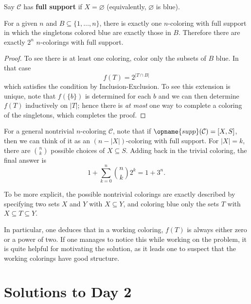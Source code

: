 \documentclass[11pt]{scrartcl}
\begin{document}
Say $\mathcal C$ has \textbf{full support}
if $X = \varnothing$ (equivalently, $\varnothing$ is blue).

\begin{lemma*}
For a given $n$ and $B \subseteq \{1,\dots,n\}$,
there is exactly one $n$-coloring with full support
in which the singletons colored blue are exactly those in $B$.
Therefore there are exactly $2^n$ $n$-colorings with full support.
\end{lemma*}
\begin{proof}
To see there is at least one coloring, color only the subsets of $B$ blue.
In that case \[ f(T) = 2^{\left\lvert T \cap B \right\rvert} \]
which satisfies the condition by Inclusion-Exclusion.
To see this extension is unique,
note that $f(\{b\})$ is determined for each $b$ and we can then determine $f(T)$
inductively on $\left\lvert T \right\rvert$;
hence there is \emph{at most} one way to complete a coloring of the singletons,
which completes the proof.
\end{proof}

For a general nontrivial $n$-coloring $\mathcal C$,
note that if $\opname{supp}(\mathcal C) = [X,S]$,
then we can think of it as an
$(n-\left\lvert X \right\rvert)$-coloring with full support.
For $\left\lvert X \right\rvert = k$, there are $\binom nk$ possible choices of $X \subseteq S$.
Adding back in the trivial coloring, the final answer is
\[ 1 + \sum_{k=0}^n \binom nk 2^k = \boxed{1 + 3^n}. \]

\begin{remark*}
  To be more explicit,
  the possible nontrivial colorings are exactly described
  by specifying two sets $X$ and $Y$ with $X \subseteq Y$,
  and coloring blue only the sets $T$
  with $X \subseteq T \subseteq Y$.

  In particular, one deduces that in a working coloring,
  $f(T)$ is always either zero or a power of two.
  If one manages to notice this while working on the problem,
  it is quite helpful for motivating the solution,
  as it leads one to suspect that the working colorings
  have good structure.
\end{remark*}
\pagebreak

\section{Solutions to Day 2}
\end{document}
